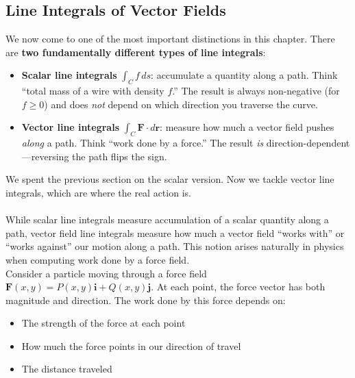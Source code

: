 \subsection*{Line Integrals of Vector Fields}

\noindent We now come to one of the most important distinctions in this chapter. There are \textbf{two fundamentally different types of line integrals}:
\begin{itemize}
\item \textbf{Scalar line integrals} \( \int_C f \, ds \): accumulate a quantity along a path. Think ``total mass of a wire with density \( f \).'' The result is always non-negative (for \( f \geq 0 \)) and does \textit{not} depend on which direction you traverse the curve.
\item \textbf{Vector line integrals} \( \int_C \mathbf{F} \cdot d\mathbf{r} \): measure how much a vector field pushes \textit{along} a path. Think ``work done by a force.'' The result \textit{is} direction-dependent---reversing the path flips the sign.
\end{itemize}
\noindent We spent the previous section on the scalar version. Now we tackle vector line integrals, which are where the real action is.\\ \\
\noindent While scalar line integrals measure accumulation of a scalar quantity along a path, vector field line integrals measure how much a vector field ``works with'' or ``works against'' our motion along a path. This notion arises naturally in physics when computing work done by a force field. \\

\noindent Consider a particle moving through a force field $\mathbf{F}(x,y) = P(x,y)\mathbf{i} + Q(x,y)\mathbf{j}$. At each point, the force vector has both magnitude and direction. The work done by this force depends on:
\begin{itemize}
    \item The strength of the force at each point
    \item How much the force points in our direction of travel
    \item The distance traveled
\end{itemize}

